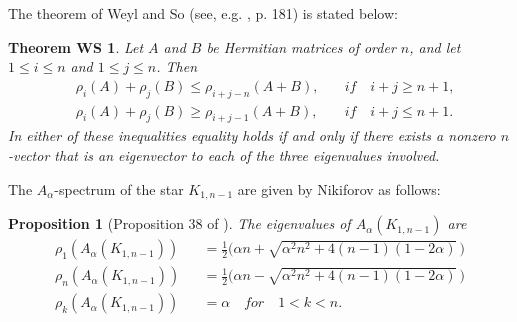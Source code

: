 \documentclass[amsthm]{elsart}
\newtheorem{proposition}{Proposition}[section]
\newtheorem*{thmWS}{Theorem WS}
\begin{document}
The theorem of Weyl and So (see, e.g. \cite{1985MatrixAnalysis}, p. 181) is stated below:
\begin{thmWS} Let $A$ and $B$ be Hermitian matrices of order $n$, and let $1 \leqslant i \leqslant n$ and $1 \leqslant j \leqslant n$.
Then
\begin{eqnarray*}
&\rho _i (A) + \rho _j (B) \leqslant \rho _{i+j-n} (A + B), \quad &if \quad i+j \geqslant n + 1,
\\ &\rho _i (A) + \rho _j (B) \geqslant \rho _{i+j-1} (A + B), \quad &if \quad i+j \leqslant n + 1.
\end{eqnarray*}
In either of these inequalities equality holds if and only if there exists a nonzero $n$-vector that is an eigenvector to each of the three eigenvalues involved.
\end{thmWS}

The $A_\alpha$-spectrum of the star $K_{1,n-1}$ are given by Nikiforov as follows:
\begin{proposition} [Proposition 38 of \cite{2016Merging}] \label{prop:1}
The eigenvalues of $A_\alpha(K_{1,n-1})$  are
\begin{eqnarray*}
\rho_1 (A_\alpha(K_{1,n-1})) &&= \frac{1}{2} \big( \alpha n + \sqrt{\alpha ^2 n^2 + 4(n-1)(1-2\alpha)} \, \big)
\\ \rho _n (A_\alpha(K_{1,n-1})) &&= \frac{1}{2} \big( \alpha n - \sqrt{\alpha ^2 n^2 + 4(n-1)(1-2\alpha)} \, \big)
\\ \rho _k (A_\alpha(K_{1,n-1})) &&= \alpha \quad for \quad 1<k<n.
\end{eqnarray*}
\end{proposition}
\end{document}
